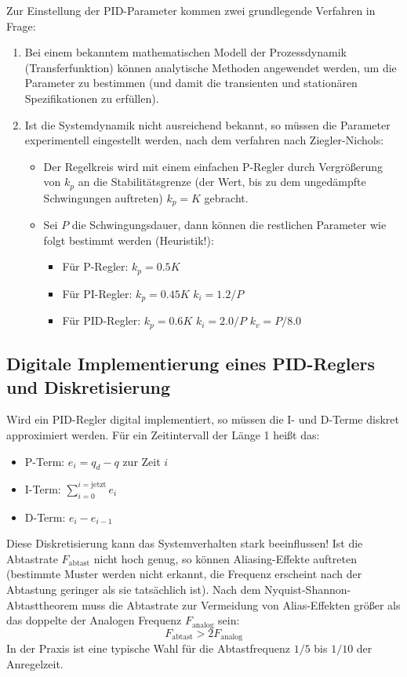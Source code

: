 			Zur Einstellung der PID-Parameter kommen zwei grundlegende Verfahren in Frage:
			\begin{enumerate}
				\item Bei einem bekanntem mathematischen Modell der Prozessdynamik (Transferfunktion) können analytische Methoden angewendet werden, um die Parameter zu bestimmen (und damit die transienten und stationären Spezifikationen zu erfüllen).
				\item Ist die Systemdynamik nicht ausreichend bekannt, so müssen die Parameter experimentell eingestellt werden, \zB nach dem verfahren nach Ziegler-Nichols:
					\begin{itemize}
						\item Der Regelkreis wird mit einem einfachen P-Regler durch Vergrößerung von \(k_p\) an die Stabilitätsgrenze (der Wert, bis zu dem ungedämpfte Schwingungen auftreten) \( k_p = K \) gebracht.
						\item Sei \(P\) die Schwingungsdauer, dann können die restlichen Parameter wie folgt bestimmt werden (Heuristik!):
							\begin{itemize}
								\item Für P-Regler:   \tabto{3cm} \( k_p = 0.5K \)
								\item Für PI-Regler:  \tabto{3cm} \( k_p = 0.45K \) \tabto{5.5cm} \( k_i = 1.2 / P \)
								\item Für PID-Regler: \tabto{3cm} \( k_p = 0.6K \)  \tabto{5.5cm} \( k_i = 2.0 / P \) \tabto{8cm} \( k_v = P / 8.0 \)
							\end{itemize}
					\end{itemize}
			\end{enumerate}

	\subsection{Digitale Implementierung eines PID-Reglers und Diskretisierung}
		Wird ein PID-Regler digital implementiert, so müssen die I- und D-Terme diskret approximiert werden. Für ein Zeitintervall der Länge \num{1} heißt das:
		\begin{itemize}
			\item P-Term: \tabto{2cm} \( e_i = q_d - q \) zur Zeit \(i\)
			\item I-Term: \tabto{2cm} \( \sum_{i = 0}^{i = \text{jetzt}} e_i \)
			\item D-Term: \tabto{2cm} \( e_i - e_{i - 1} \)
		\end{itemize}
		Diese Diskretisierung kann das Systemverhalten stark beeinflussen! Ist die Abtastrate \( F_\text{abtast} \) nicht hoch genug, so können Aliasing-Effekte auftreten (\dh bestimmte Muster werden nicht erkannt, die Frequenz erscheint nach der Abtastung geringer als sie tatsächlich ist). Nach dem Nyquist-Shannon-Abtasttheorem muss die Abtastrate zur Vermeidung von Alias-Effekten größer als das doppelte der Analogen Frequenz \( F_\text{analog} \) sein:
		\begin{equation*}
			F_\text{abtast} > 2 F_\text{analog}
		\end{equation*}
		In der Praxis ist eine typische Wahl für die Abtastfrequenz \( 1/5 \) bis \( 1/10 \) der Anregelzeit.

